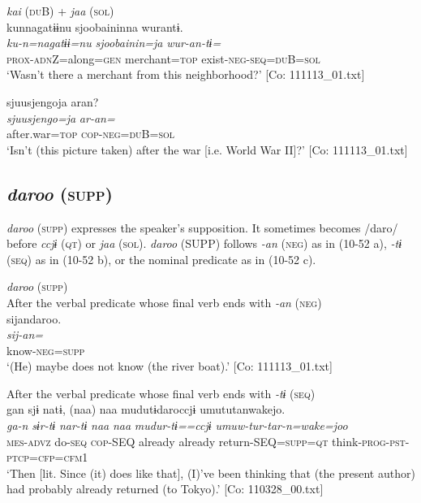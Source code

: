 \ea\label{ex:10.51}   \textit{kai} (\textsc{du}B) + \textit{jaa} (\textsc{sol})\\
  \ea  %
      \glll    kunnagatɨɨnu  {\textbar}sjoobainin{\textbar}na  wurantɨ.\\
      \textit{ku-n=nagatɨɨ=nu}  \textit{sjoobainin=ja}  \textit{wur-an-tɨ=}\\
      \textsc{prox}-\textsc{adn}Z=along=\textsc{gen}  merchant=\textsc{top}  exist-\textsc{neg}-\textsc{seq}=\textsc{du}B=\textsc{sol}\\
      \glt       ‘Wasn’t there a merchant from this neighborhood?’ [Co: 111113\_01.txt]

  \ex %
      \glll    {\textbar}sjuusjengo{\textbar}ja  aran?\\
      \textit{sjuusjengo=ja}  \textit{ar-an=}\\
      after.war=\textsc{top}  \textsc{cop}-\textsc{neg}=\textsc{du}B=\textsc{sol}\\
      \glt       ‘Isn’t (this picture taken) after the war [i.e. World War II]?’ [Co: 111113\_01.txt]
    \z
\z

\subsection{\textit{daroo} (\textsc{supp})}\label{sec:10.3.7}

\textit{daroo} (\textsc{supp}) expresses the speaker’s supposition. It sometimes becomes /daro/ before \textit{ccjɨ} (\textsc{qt}) or \textit{jaa} (\textsc{sol}). \textit{daroo} (SUPP) follows \textit{{}-an} (\textsc{neg}) as in (10-52 a), \textit{{}-tɨ} (\textsc{seq}) as in (10-52 b), or the nominal predicate as in (10-52 c).

\ea\label{ex:10.52}   \textit{daroo} (\textsc{supp})\\
  \ea After the verbal predicate whose final verb ends with \textit{{}-an} (\textsc{neg})\\
      \glll    sijandaroo.\\
    \textit{sij-an=}\\
    know-\textsc{neg}=\textsc{supp}\\
\glt     ‘(He) maybe does not know (the river boat).’  [Co: 111113\_01.txt]

  \ex After the verbal predicate whose final verb ends with \textit{{}-tɨ} (\textsc{seq})\\
      \glll    gan  sjɨ  natɨ,  (naa)  naa  mudutɨdaroccjɨ   umututanwakejo.\\
    \textit{ga-n}  \textit{sɨr-tɨ}  \textit{nar-tɨ}  \textit{naa}  \textit{naa}  \textit{mudur-tɨ==ccjɨ}   \textit{umuw-tur-tar-n=wake=joo}\\
    \textsc{mes}-\textsc{advz}  do-\textsc{seq}  \textsc{cop}-SEQ  already  already  return-SEQ=\textsc{supp}=\textsc{qt}  think-\textsc{prog}-\textsc{pst}-\textsc{ptcp}=\textsc{cfp}=\textsc{cfm}1\\
\glt     ‘Then [lit. Since (it) does like that], (I)’ve been thinking that (the present author) had probably already returned (to Tokyo).’  [Co: 110328\_00.txt]

